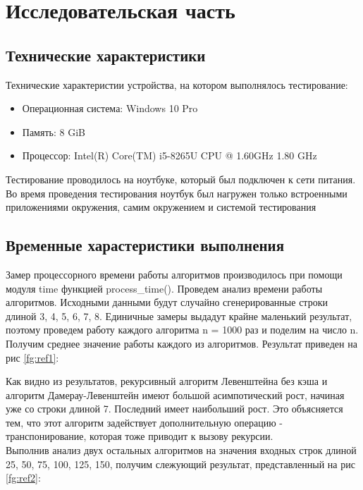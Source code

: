 \documentclass[12pt, a4paper]{article}
\begin{document}
\newpage
\section{Исследовательская часть}
\subsection{Технические характеристики}
Технические характеристии устройства, на котором выполнялось тестирование:
\begin{itemize}
	\item Операционная система: Windows 10 Pro
	\item Память: 8 GiB
	\item Процессор: Intel(R) Core(TM) i5-8265U CPU @ 1.60GHz   1.80 GHz
\end{itemize}
Тестирование проводилось на ноутбуке, который был подключен к сети питания. Во время проведения тестирования ноутбук был нагружен только встроенными приложениями окружения, самим окружением и системой тестирования

\subsection{Временные харастеристики выполнения}
Замер процессорного времени работы алгоритмов производилось при помощи модуля time функцией process\_time().
Проведем анализ времени работы алгоритмов. Исходными данными будут случайно сгенерированные строки длиной {3, 4, 5, 6, 7, 8}. Единичные замеры выдадут крайне маленький результат, поэтому  проведем работу каждого алгоритма n = 1000 раз и поделим на число n. Получим среднее значение работы каждого из алгоритмов. Результат приведен на рис \ref{fg:ref1}:

\begin{figure}[ht!]
\end{figure} 

Как видно из результатов, рекурсивный алгоритм Левенштейна без кэша и алгоритм Дамерау-Левенштейн имеют большой асимпотический рост, начиная уже со строки длиной 7. Последний имеет наибольший рост. Это объясняется тем, что этот алгоритм задействует дополнительную операцию - транспонирование, которая тоже приводит к вызову рекурсии. \\
Выполнив анализ двух остальных алгоритмов на значения входных строк длиной {25, 50, 75, 100, 125, 150}, получим слежующий результат, представленный на рис \ref{fg:ref2}:
\begin{figure}[ht!]
\end{figure} 
\end{document}
